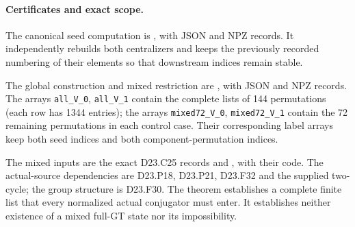 \paragraph{Certificates and exact scope.}
The canonical seed computation is
, with JSON and NPZ
records. It independently rebuilds both centralizers and
keeps the previously recorded numbering of their elements
so that downstream indices remain stable.

The global construction and mixed restriction are
, with JSON and NPZ
records. The arrays \texttt{all\_V\_0}, \texttt{all\_V\_1}
contain the complete lists of 144 permutations
(each row has 1344 entries); the arrays
\texttt{mixed72\_V\_0}, \texttt{mixed72\_V\_1} contain
the 72 remaining permutations in each control case.
Their corresponding label arrays keep both seed indices
and both component-permutation indices.

The mixed inputs are the exact D23.C25 records
 and
,
with their code. The actual-source dependencies are
D23.P18, D23.P21, D23.F32 and the supplied two-cycle;
the group structure is D23.F30. The theorem establishes
a complete finite list that every normalized actual
conjugator must enter. It establishes neither existence
of a mixed full-GT state nor its impossibility.
